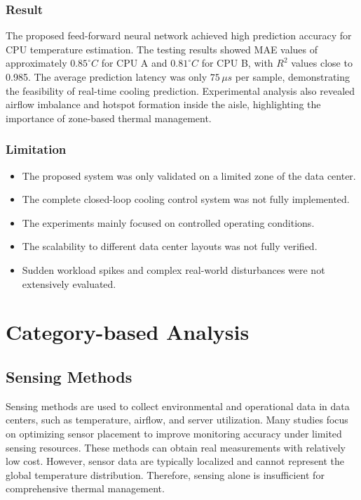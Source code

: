 \documentclass[12pt,a4paper]{article}
\begin{document}
    \subsubsection{Result}
    The proposed feed-forward neural network achieved high prediction accuracy for CPU temperature estimation. The testing results showed MAE values of approximately $0.85^\circ C$ for CPU A and $0.81^\circ C$ for CPU B, with $R^2$ values close to 0.985. The average prediction latency was only $75\,\mu s$ per sample, demonstrating the feasibility of real-time cooling prediction. Experimental analysis also revealed airflow imbalance and hotspot formation inside the aisle, highlighting the importance of zone-based thermal management.

    \subsubsection{Limitation}
                \begin{itemize}
                \item The proposed system was only validated on a limited zone of the data center.
                \item The complete closed-loop cooling control system was not fully implemented.
                \item The experiments mainly focused on controlled operating conditions.
                \item The scalability to different data center layouts was not fully verified.
                \item Sudden workload spikes and complex real-world disturbances were not extensively evaluated.
                \end{itemize}
\newpage

\section{Category-based Analysis}

    \subsection{Sensing Methods}
    Sensing methods are used to collect environmental and operational data in data centers, such as temperature, airflow, and server utilization. Many studies focus on optimizing sensor placement to improve monitoring accuracy under limited sensing resources. These methods can obtain real measurements with relatively low cost. However, sensor data are typically localized and cannot represent the global temperature distribution. Therefore, sensing alone is insufficient for comprehensive thermal management.
\end{document}
